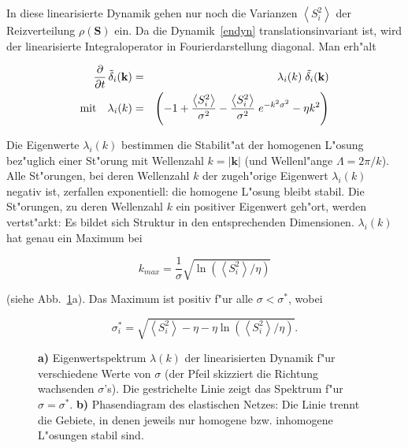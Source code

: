 In diese linearisierte Dynamik gehen nur noch die Varianzen
$\left<S_i^2\right>$ der Reizverteilung $\rho(\mathbf{S})$ ein.  Da die
Dynamik~\eqref{endyn} translationsinvariant ist, wird der linearisierte
Integraloperator in Fourierdarstellung diagonal.  Man erh"alt

\begin{eqnarray*}
\frac{\partial}{\partial t}\,
\Tilde{\delta}_i(\mathbf{k})&=& \lambda_i(k)\;
\Tilde{\mathbf{\delta}_i}(\mathbf{k})\\
\text{mit}\quad\lambda_i(k)&=&\left(-1+\frac{\left<S_i^2\right>}{\sigma^2}-
\frac{\left<S_i^2\right>}{\sigma^2}\; e^{-k^2\sigma^2}-\eta
k^2\right)\nonumber
\end{eqnarray*}

Die Eigenwerte $\lambda_i(k)$ bestimmen die Stabilit"at der homogenen
L"osung bez"uglich einer St"orung mit Wellenzahl $k = |\mathbf{k}|$ (und
Wellenl"ange $\Lambda = 2 \pi / k$).  Alle St"orungen, bei deren Wellenzahl
$k$ der zugeh"orige Eigenwert $\lambda_i(k)$ negativ ist, zerfallen exponentiell: die homogene L"osung
bleibt stabil. Die St"orungen, zu deren Wellenzahl $k$ ein positiver
Eigenwert geh"ort, werden vertst"arkt: Es bildet sich Struktur in den
entsprechenden Dimensionen. $\lambda_i (k)$ hat genau ein Maximum bei

\begin{equation}
k_{max}=\frac{1}{\sigma} \sqrt{\ln(\left<S_i^2\right>/\eta)}
\label{kkrit}
\end{equation}

\noindent (siehe Abb.~\ref{spektrum}a). Das Maximum ist positiv f"ur alle
$\sigma <\sigma^\ast$, wobei

\begin{equation}
\sigma^\ast_i=\sqrt{\left<S_i^2\right>-\eta-\eta \ln(\left<S_i^2\right>/\eta)}.
\label{sigkrit}
\end{equation}

\begin{figure}[t]
\begin{center}
\caption{\textbf{a)} Eigenwertspektrum $\lambda(k)$ 
der linearisierten Dynamik f"ur verschiedene Werte von
$\sigma$ (der Pfeil skizziert die Richtung wachsenden $\sigma$'s). Die
gestrichelte Linie zeigt das Spektrum f"ur $\sigma=\sigma^\ast$.
\textbf{b)} Phasendiagram des elastischen Netzes: Die Linie
trennt die Gebiete, in denen jeweils nur homogene bzw.  inhomogene
L"osungen stabil sind.}
\end{center}
\label{spektrum}
\end{figure}

